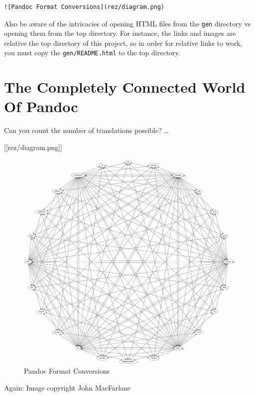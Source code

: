 \documentclass[oneside,]{memoir}
\makeatletter
\def\maxwidth{\ifdim\Gin@nat@width>\linewidth\linewidth
\else\Gin@nat@width\fi}
\let\Oldincludegraphics\includegraphics
\renewcommand{\includegraphics}[1]{\Oldincludegraphics[width=\maxwidth]{#1}}
\makeatother
\begin{document}
\begin{verbatim}
![Pandoc Format Conversions](rez/diagram.png)
\end{verbatim}
Also be aware of the intricacies of opening HTML files from the
\texttt{gen} directory vs opening them from the top directory. For
instance, the links and images are relative the top directory of this
project, so in order for relative links to work, you must copy the
\texttt{gen/README.html} to the top directory.

\section{The Completely Connected World Of Pandoc}

Can you count the number of translations possible? \ldots{}

{[}{[}rez/diagram.png{]}{]}

\begin{figure}[htbp]
\centering
\includegraphics{rez/diagram.png}
\caption{Pandoc Format Conversions}
\end{figure}

Again: Image copyright John MacFarlane
\end{document}

